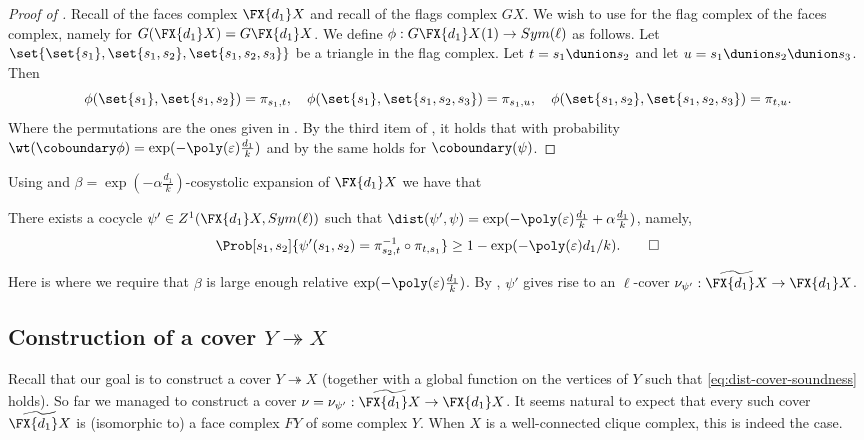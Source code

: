     \begin{proof}[Proof of ]
        Recall  of the faces complex $\FX{d_1}X$ and recall  of the flags complex $GX$. We wish to use  for the flag complex of the faces complex, namely for $G(\FX{d_1}X) = G\FX{d_1}X$.  We define \(\phi:G\FX{d_1}X(1) \to Sym(\ell)\) as follows. Let \(\set{\set{s_1},\set{s_1,s_2},\set{s_1,s_2,s_3}}\) be a triangle in the flag complex. Let \(t = s_1 \dunion s_2\) and let \(u = s_1 \dunion s_2 \dunion s_3\). Then
        \[\phi(\set{s_1}, \set{s_1,s_2})=\pi_{s_1,t}, \quad \phi(\set{s_1}, \set{s_1,s_2,s_3})=\pi_{s_1,u}, \quad \phi(\set{s_1,s_2}, \set{s_1,s_2,s_3})=\pi_{t,u}.\]
        Where the permutations are the ones given in . By the third item of , it holds that with probability \(\wt(\coboundary \phi) = \exp(-\poly(\varepsilon)\frac{d_1}{k})\) and by  the same holds for \(\coboundary(\psi)\).
    \end{proof}
%
Using  and \(\beta=\exp(-\alpha\frac{d_1}{k})\)-cosystolic expansion of \(\FX{d_1}X\) we have that
\begin{corollary} \label{cor:good-cocycle}
    There exists a cocycle \(\psi' \in Z^1(\FX{d_1}X,Sym(\ell))\) such that $\dist(\psi',\psi) = \exp(-\poly(\varepsilon)\frac{d_1}{k} + \alpha \frac{d_1}{k})$, namely,
    \[\Prob[s_1,s_2]{\psi'(s_1,s_2) = \pi_{s_2,t}^{-1}\circ  \pi_{t,s_1}} \geq 1-\exp(-\poly(\varepsilon)d_1/k). \qed\]
\end{corollary}
Here is where we require that \(\beta\) is large enough relative \(\exp(-\poly(\varepsilon)\frac{d_1}{k})\). By , \(\psi'\) gives rise to an \(\ell\)-cover \(\nu_{\psi'}:\widetilde{\FX{d_1}X} \to \FX{d_1}X\).
%
\subsection[Construction of a cover Y to X]{Construction of a cover \(Y \twoheadrightarrow X\)} Recall that our goal is to construct a cover \(Y \twoheadrightarrow X\) (together with a global function on the vertices of \(Y\) such that \eqref{eq:dist-cover-soundness} holds). So far we managed to construct a cover \(\nu = \nu_{\psi'}:\widetilde{\FX{d_1}X} \to \FX{d_1}X\). It seems natural to expect that every such cover \(\widetilde{\FX{d_1}X}\) is (isomorphic to) a face complex \(FY\) of some complex \(Y\). When \(X\) is a well-connected clique complex, this is indeed the case.

